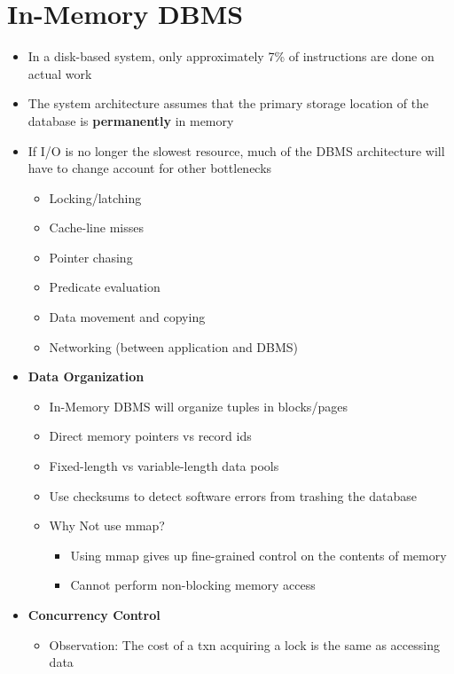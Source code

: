 \documentclass[11pt]{article}
\begin{document}
\section{In-Memory DBMS}
\begin{itemize}
    \item In a disk-based system, only approximately 7\% of instructions are done on actual work~\cite{looking-glass}
    \item The system architecture assumes that the primary storage location of the database is \textbf{permanently} in memory
    \item If I/O is no longer the slowest resource, much of the DBMS architecture will have to change account for other bottlenecks~\cite{non-volatile}
    \begin{itemize}
        \item Locking/latching
        \item Cache-line misses
        \item Pointer chasing
        \item Predicate evaluation
        \item Data movement and copying
        \item Networking (between application and DBMS)
    \end{itemize}
    \item \textbf{Data Organization}
    \begin{itemize}
        \item In-Memory DBMS will organize tuples in blocks/pages
        \item Direct memory pointers vs record ids
        \item Fixed-length vs variable-length data pools
        \item Use checksums to detect software errors from trashing the database
        \item Why Not use mmap?
        \begin{itemize}
            \item Using mmap gives up fine-grained control on the contents of memory
            \item Cannot perform non-blocking memory access
        \end{itemize}
    \end{itemize}
    \item \textbf{Concurrency Control}
    \begin{itemize}
        \item Observation: The cost of a txn acquiring a lock is the same as accessing data

\end{itemize}
\end{itemize}
\end{document}
